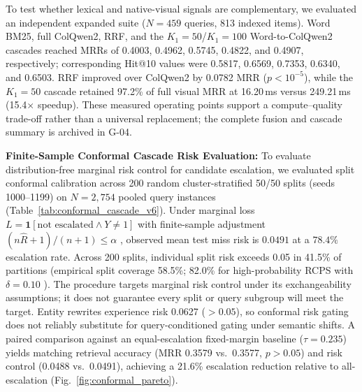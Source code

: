 To test whether lexical and native-visual signals are complementary, we evaluated an independent expanded suite ($N=459$ queries, 813 indexed items). Word BM25, full ColQwen2, RRF, and the $K_1=50$/$K_1=100$ Word-to-ColQwen2 cascades reached MRRs of 0.4003, 0.4962, 0.5745, 0.4822, and 0.4907, respectively; corresponding Hit@10 values were 0.5817, 0.6569, 0.7353, 0.6340, and 0.6503. RRF improved over ColQwen2 by 0.0782 MRR ($p<10^{-5}$), while the $K_1=50$ cascade retained 97.2\% of full visual MRR at 16.20\,ms versus 249.21\,ms (15.4$\times$ speedup). These measured operating points support a compute--quality trade-off rather than a universal replacement; the complete fusion and cascade summary is archived in G-04.

\textbf{Finite-Sample Conformal Cascade Risk Evaluation:}
To evaluate distribution-free marginal risk control for candidate escalation, we evaluated split conformal calibration across 200 random cluster-stratified 50/50 splits (seeds 1000--1199) on $N=2{,}754$ pooled query instances (Table~\ref{tab:conformal_cascade_v6}). Under marginal loss $L = \mathbf{1}[\text{not escalated} \land Y \ne 1]$ with finite-sample adjustment $(n\hat{R}+1)/(n+1) \le \alpha$ \cite{bates2021conformal, angelopoulos2021gentle}, observed mean test miss risk is $0.0491$ at a $78.4\%$ escalation rate. Across 200 splits, individual split risk exceeds 0.05 in 41.5\% of partitions (empirical split coverage 58.5\%; 82.0\% for high-probability RCPS with $\delta=0.10$ \cite{bates2021conformal}). The procedure targets marginal risk control under its exchangeability assumptions; it does not guarantee every split or query subgroup will meet the target. Entity rewrites experience risk 0.0627 ($>0.05$), so conformal risk gating does not reliably substitute for query-conditioned gating under semantic shifts. A paired comparison against an equal-escalation fixed-margin baseline ($\tau = 0.235$) yields matching retrieval accuracy (MRR 0.3579 vs.\ 0.3577, $p > 0.05$) and risk control (0.0488 vs.\ 0.0491), achieving a 21.6\% escalation reduction relative to all-escalation (Fig.~\ref{fig:conformal_pareto}).

